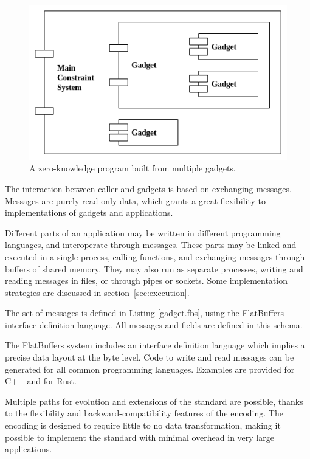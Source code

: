 \begin{figure}[!h]
	\centering
	\includegraphics[width=0.7\linewidth]{graphics/program_components.png}
	\caption{A zero-knowledge program built from multiple gadgets.}
	\label{program_components}
\end{figure}



	The interaction between caller and gadgets is based on exchanging messages.
	Messages are purely read-only data, which grants a great flexibility to
	implementations of gadgets and applications.


	Different parts of an application may be written in different programming languages, and interoperate through messages.
	These parts may be linked and executed in a single process, calling functions,
	and exchanging messages through buffers of shared memory.
	They may also run as separate processes, writing and reading messages in files, or through pipes or sockets.
	Some implementation strategies are discussed in section~\ref{sec:execution}.


	The set of messages is defined in Listing \ref{gadget.fbs}, 
	using the FlatBuffers interface definition language.
	All messages and fields are defined in this schema.

	The FlatBuffers system includes an interface definition language
	which implies a precise data layout at the byte level.
	Code to write and read messages can be generated for all common programming languages.
	Examples are provided for C++ and for Rust.

	Multiple paths for evolution and extensions of the standard are possible,
	thanks to the flexibility and backward-compatibility features of the encoding.
	The encoding is designed to require little to no data transformation, making it possible
	to implement the standard with minimal overhead in very large applications.

